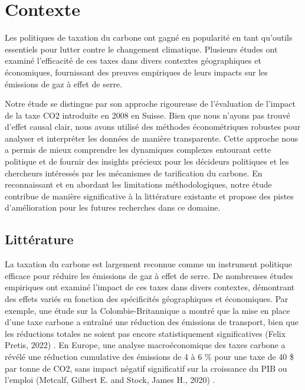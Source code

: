 \section{Contexte}
\label{sec:context}
Les politiques de taxation du carbone ont gagné en popularité en tant qu'outils essentiels pour lutter contre le changement climatique. Plusieurs études ont examiné l'efficacité de ces taxes dans divers contextes géographiques et économiques, fournissant des preuves empiriques de leurs impacts sur les émissions de gaz à effet de serre.

Notre étude se distingue par son approche rigoureuse de l'évaluation de l'impact de la taxe CO2 introduite en 2008 en Suisse. Bien que nous n'ayons pas trouvé d'effet causal clair, nous avons utilisé des méthodes économétriques robustes pour analyser et interpréter les données de manière transparente. Cette approche nous a permis de mieux comprendre les dynamiques complexes entourant cette politique et de fournir des insights précieux pour les décideurs politiques et les chercheurs intéressés par les mécanismes de tarification du carbone. En reconnaissant et en abordant les limitations méthodologiques, notre étude contribue de manière significative à la littérature existante et propose des pistes d'amélioration pour les futures recherches dans ce domaine.


\subsection{Littérature}
\label{subsec:litterature}

La taxation du carbone est largement reconnue comme un instrument politique efficace pour réduire les émissions de gaz à effet de serre. De nombreuses études empiriques ont examiné l'impact de ces taxes dans divers contextes, démontrant des effets variés en fonction des spécificités géographiques et économiques. Par exemple, une étude sur la Colombie-Britannique a montré que la mise en place d'une taxe carbone a entraîné une réduction des émissions de transport, bien que les réductions totales ne soient pas encore statistiquement significatives (Felix Pretis, 2022) \supercite{felix2022}. En Europe, une analyse macroéconomique des taxes carbone a révélé une réduction cumulative des émissions de 4 à 6 \% pour une taxe de 40 \$ par tonne de CO2, sans impact négatif significatif sur la croissance du PIB ou l'emploi (Metcalf, Gilbert E. and Stock, James H., 2020) \supercite{macro_impact}.

